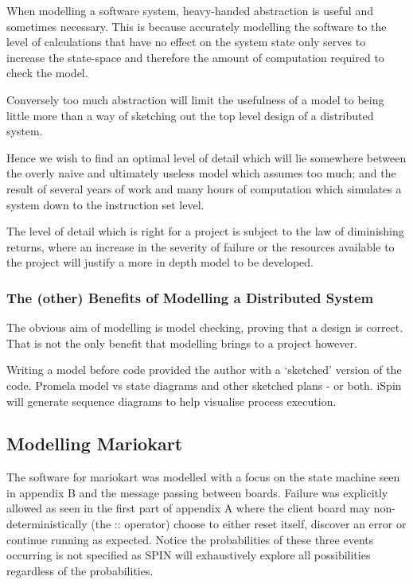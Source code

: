 When modelling a software system, heavy-handed abstraction is useful
and sometimes necessary. This is because accurately modelling the software
to the level of calculations that have no effect on the system state only 
serves to increase the state-space and therefore the amount of computation
required to check the model. 

Conversely too much abstraction will limit the usefulness of a model to 
being little more than a way of sketching out the top level design of a 
distributed system.

Hence we wish to find an optimal level of detail  which will lie somewhere between the overly 
naive and ultimately useless model which assumes too much; and the result
of several years of work and many hours of computation which simulates
a system down to the instruction set level. 

The level of detail which is right for a project is subject to the law of diminishing
returns, where an increase in the severity of failure or the resources available to
the project will justify a more in depth model to be developed.

\subsubsection{The (other) Benefits of Modelling a Distributed System}
The obvious aim of modelling is model checking, proving that a design is
correct. That is not the only benefit that modelling brings to a project
however. 

Writing a model before code provided the author with a `sketched' version of 
the code. 
Promela model vs state diagrams and other sketched plans - or both. iSpin will
 generate sequence diagrams to help visualise process execution.

\subsection{Modelling Mariokart}
The software for mariokart was modelled with a focus on the state machine seen in 
appendix B and the message passing between boards. Failure was explicitly allowed
as seen in the first part of appendix A where the client board may non-deterministically
(the :: operator) choose to either reset itself, discover an error or continue running as
expected. Notice the probabilities of these three events occurring is not specified
as SPIN will exhaustively explore all possibilities regardless of the probabilities.

